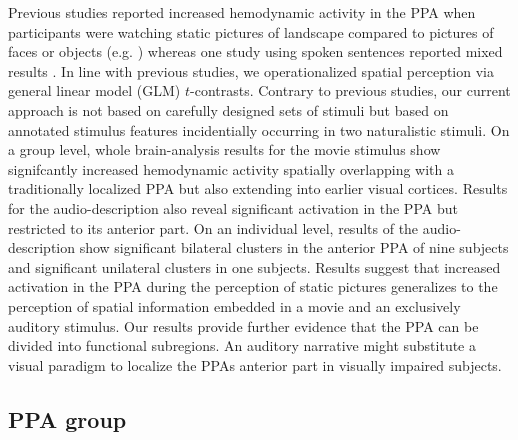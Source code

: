 \documentclass[english]{article}
\begin{document}
Previous studies reported increased hemodynamic activity in the PPA when
participants were watching static pictures of landscape compared to pictures of
faces or objects (e.g. \citep{epstein1998ppa, epstein1999parahippocampal})
whereas one study using spoken sentences reported mixed results
\citep{aziz2008modulation}.
In line with previous studies, we operationalized spatial perception via general
linear model (GLM) $t$-contrasts.
Contrary to previous studies, our current approach is not based on carefully
designed sets of stimuli but based on annotated stimulus features incidentially
occurring in two naturalistic stimuli.
On a group level, whole brain-analysis results for the movie stimulus show
signifcantly increased hemodynamic activity spatially overlapping with a
traditionally localized PPA but also extending into earlier visual cortices.
Results for the audio-description also reveal significant activation in the PPA
but restricted to its anterior part.
On an individual level, results of the audio-description show significant
bilateral clusters in the anterior PPA of nine subjects and significant
unilateral clusters in one subjects.
Results suggest that increased activation in the PPA during the perception of
static pictures generalizes to the perception of spatial information embedded in
a movie and an exclusively auditory stimulus.
Our results provide further evidence that the PPA can be divided into functional
subregions.
An auditory narrative might substitute a visual paradigm to localize
the PPAs anterior part in visually impaired subjects.


\subsection{PPA group}

\end{document}
